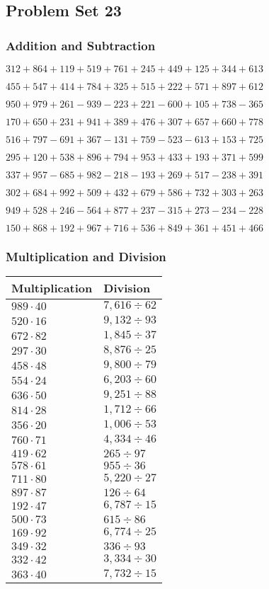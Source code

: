 \hypertarget{problem-set-23-2}{%
\subsection{Problem Set 23}\label{problem-set-23-2}}

\hypertarget{addition-and-subtraction-123}{%
\subsubsection{Addition and
Subtraction}\label{addition-and-subtraction-123}}

\(312 + 864 + 119 + 519 + 761 + 245 + 449 + 125 + 344 + 613\)

\(455 + 547 + 414 + 784 + 325 + 515 + 222 + 571 + 897 + 612\)

\(950 + 979 + 261 - 939 - 223 + 221 - 600 + 105 + 738 - 365\)

\(170 + 650 + 231 + 941 + 389 + 476 + 307 + 657 + 660 + 778\)

\(516 + 797 - 691 + 367 - 131 + 759 - 523 - 613 + 153 + 725\)

\(295 + 120 + 538 + 896 + 794 + 953 + 433 + 193 + 371 + 599\)

\(337 + 957 - 685 + 982 - 218 - 193 + 269 + 517 - 238 + 391\)

\(302 + 684 + 992 + 509 + 432 + 679 + 586 + 732 + 303 + 263\)

\(949 + 528 + 246 - 564 + 877 + 237 - 315 + 273 - 234 - 228\)

\(150 + 868 + 192 + 967 + 716 + 536 + 849 + 361 + 451 + 466\)

\hypertarget{multiplication-and-division-123}{%
\subsubsection{Multiplication and
Division}\label{multiplication-and-division-123}}

\begin{longtable}[]{@{}ll@{}}
\toprule
Multiplication & Division\tabularnewline
\midrule
\endhead
\(989 \cdot 40\) & \(7,616÷62\)\tabularnewline
\(520 \cdot 16\) & \(9,132÷93\)\tabularnewline
\(672 \cdot 82\) & \(1,845÷37\)\tabularnewline
\(297 \cdot 30\) & \(8,876÷25\)\tabularnewline
\(458 \cdot 48\) & \(9,800÷79\)\tabularnewline
\(554 \cdot 24\) & \(6,203÷60\)\tabularnewline
\(636 \cdot 50\) & \(9,251÷88\)\tabularnewline
\(814 \cdot 28\) & \(1,712÷66\)\tabularnewline
\(356 \cdot 20\) & \(1,006÷53\)\tabularnewline
\(760 \cdot 71\) & \(4,334÷46\)\tabularnewline
\(419 \cdot 62\) & \(265÷97\)\tabularnewline
\(578 \cdot 61\) & \(955÷36\)\tabularnewline
\(711 \cdot 80\) & \(5,220÷27\)\tabularnewline
\(897 \cdot 87\) & \(126÷64\)\tabularnewline
\(192 \cdot 47\) & \(6,787÷15\)\tabularnewline
\(500 \cdot 73\) & \(615÷86\)\tabularnewline
\(169 \cdot 92\) & \(6,774÷25\)\tabularnewline
\(349 \cdot 32\) & \(336÷93\)\tabularnewline
\(332 \cdot 42\) & \(3,334÷30\)\tabularnewline
\(363 \cdot 40\) & \(7,732÷15\)\tabularnewline
\bottomrule
\end{longtable}

